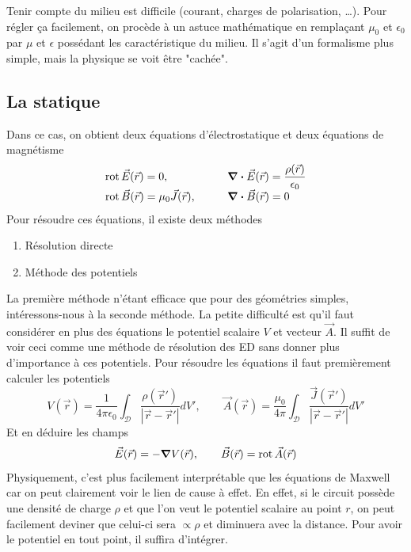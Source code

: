 Tenir compte du milieu est difficile (courant, charges de polarisation, \dots). Pour régler 
ça facilement, on procède à un astuce mathématique en remplaçant $\mu_0$ et $\epsilon_0$ par 
$\mu$ et $\epsilon$ possédant les caractéristique du milieu. Il s'agit d'un formalisme plus 
simple, mais la physique se voit être "cachée".

\newpage
\subsection{La statique}
Dans ce cas, on obtient deux équations d'électrostatique et deux équations de magnétisme 
\begin{equation}
\begin{array}{ll}
\rot \vec{E}(\vec{r}) = 0,\qquad & \div \vec{E}(\vec{r}) = \dfrac{\rho(\vec{r})}{\epsilon_0}\\
\rot \vec{B}(\vec{r}) = \mu_0\vec{J}(\vec{r}),\qquad & \div \vec{B}(\vec{r}) = 0
\end{array}
\end{equation}
Pour résoudre ces équations, il existe deux méthodes 
\begin{enumerate}
\item Résolution directe
\item Méthode des potentiels
\end{enumerate}
La première méthode n'étant efficace que pour des géométries simples, intéressons-nous à la 
seconde méthode. La petite difficulté est qu'il faut considérer en plus des équations le 
potentiel scalaire $V$ et vecteur $\vec{A}$. Il suffit de voir ceci comme une méthode de 
résolution des ED sans donner plus d'importance à ces potentiels. Pour résoudre les équations 
il faut premièrement calculer les potentiels 
\begin{equation}
V(\vec{r}) = \frac{1}{4\pi\epsilon_0}\int_\mathcal{D}\frac{\rho(\vec{r}')}{|\vec{r}-\vec{r}'|}dV',\qquad
\vec{A}(\vec{r}) = \frac{\mu_0}{4\pi}\int_\mathcal{D}\frac{\vec{J}(\vec{r}')}{|\vec{r}-\vec{r}'|}dV'
\end{equation}
Et en déduire les champs
\begin{equation}
\vec{E}(\vec{r}) = -\grad V(\vec{r}),\qquad \vec{B}(\vec{r}) = \rot \vec{A}(\vec{r})
\end{equation}
Physiquement, c'est plus facilement interprétable que les équations de Maxwell car on peut 
clairement voir le lien de cause à effet. En effet, si le circuit possède une densité de 
charge $\rho$ et que l'on veut le potentiel scalaire au point $r$, on peut facilement deviner 
que celui-ci sera $\propto \rho$ et diminuera avec la distance. Pour avoir le potentiel en 
tout point, il suffira d'intégrer.

